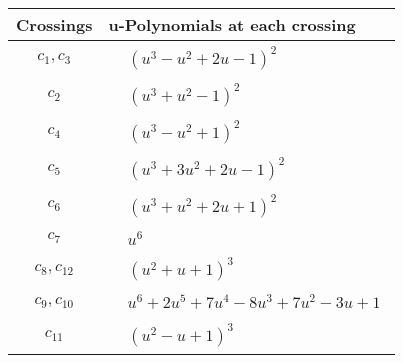 \documentclass[1p]{elsarticle_modified}
\theoremstyle{definition}
\begin{document}
\begin{tabular}{m{50pt}|m{274pt}}
Crossings & \hspace{64pt}u-Polynomials at each crossing \\
\hline $$\begin{aligned}c_{1},c_{3}\end{aligned}$$&$\begin{aligned}
&(u^3- u^2+2 u-1)^2
\end{aligned}$\\
\hline $$\begin{aligned}c_{2}\end{aligned}$$&$\begin{aligned}
&(u^3+u^2-1)^2
\end{aligned}$\\
\hline $$\begin{aligned}c_{4}\end{aligned}$$&$\begin{aligned}
&(u^3- u^2+1)^2
\end{aligned}$\\
\hline $$\begin{aligned}c_{5}\end{aligned}$$&$\begin{aligned}
&(u^3+3 u^2+2 u-1)^2
\end{aligned}$\\
\hline $$\begin{aligned}c_{6}\end{aligned}$$&$\begin{aligned}
&(u^3+u^2+2 u+1)^2
\end{aligned}$\\
\hline $$\begin{aligned}c_{7}\end{aligned}$$&$\begin{aligned}
&u^6
\end{aligned}$\\
\hline $$\begin{aligned}c_{8},c_{12}\end{aligned}$$&$\begin{aligned}
&(u^2+u+1)^3
\end{aligned}$\\
\hline $$\begin{aligned}c_{9},c_{10}\end{aligned}$$&$\begin{aligned}
&u^6+2 u^5+7 u^4-8 u^3+7 u^2-3 u+1
\end{aligned}$\\
\hline $$\begin{aligned}c_{11}\end{aligned}$$&$\begin{aligned}
&(u^2- u+1)^3
\end{aligned}$\\
\hline
\end{tabular}\\~\\
\end{document}
